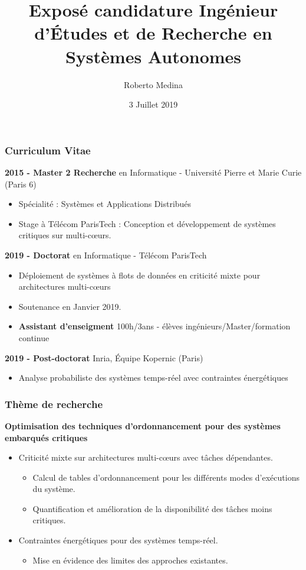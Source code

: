 \documentclass[xcolor=table]{beamer}
\title[]{Exposé candidature 
Ingénieur d'Études et de Recherche en Systèmes Autonomes} %
\author{Roberto Medina} %
\institute[Inria] %
{
Post-doctorant dans l'équipe Kopernic, Inria\\
Docteur en informatique de Télécom ParisTech\\
\medskip
\textit{roberto.medina-bonilla@inria.fr} %
}
\date{3 Juillet 2019} %
\begin{document}
\begin{frame}
\titlepage %
\end{frame}


\begin{frame}
	\frametitle{Curriculum Vitae}
	\textbf{2015 - Master 2 Recherche} en Informatique - 
			Université Pierre et Marie Curie (Paris 6)
		\begin{itemize}
			\item Spécialité : Systèmes et Applications Distribués
			\item Stage à Télécom ParisTech : Conception et développement de 
			systèmes critiques sur multi-c\oe{}urs.
		\end{itemize}
	
	\textbf{2019 - Doctorat} en Informatique - Télécom ParisTech
		\begin{itemize}
			\item Déploiement de systèmes à flots de données en criticité mixte 
			pour architectures multi-c\oe{}urs
			\item Soutenance en Janvier 2019.
			\item \textbf{Assistant d'enseigment} 100h/3ans - élèves 
			ingénieurs/Master/formation continue
		\end{itemize}
	\textbf{2019 - Post-doctorat} Inria, Équipe Kopernic (Paris)
		\begin{itemize}
			\item Analyse probabiliste des systèmes temps-réel avec contraintes 
			énergétiques
		\end{itemize}
\end{frame}


\begin{frame}
	\frametitle{Thème de recherche}
	\centering
	\textbf{Optimisation des techniques d'ordonnancement pour des systèmes 
	embarqués critiques}
	\begin{itemize}
		\item Criticité mixte sur architectures multi-c\oe{}urs 
		avec tâches dépendantes.
		\begin{itemize}
			\item Calcul de tables d'ordonnancement pour les différents modes 
			d'exécutions du système.
			\item Quantification et amélioration de la disponibilité des tâches 
			moins critiques.
		\end{itemize}
		\item Contraintes énergétiques pour des systèmes temps-réel.
		\begin{itemize}
			\item Mise en évidence des limites des approches existantes.
		\end{itemize}
	\end{itemize}
\end{frame}
\end{document}
